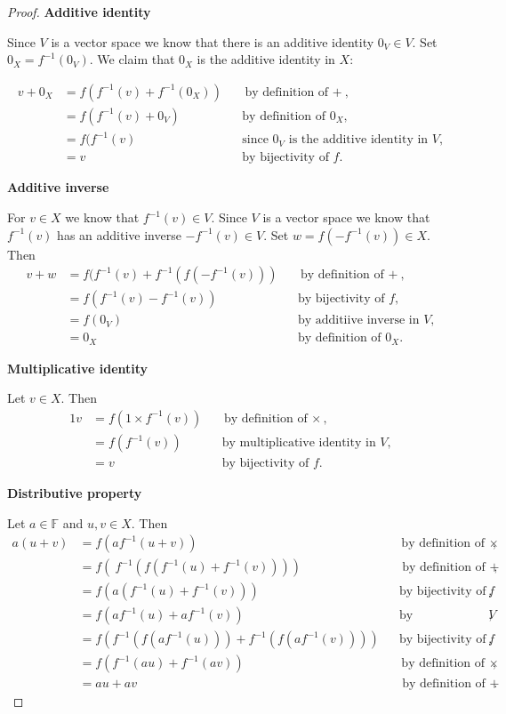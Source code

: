 \documentclass[10pt, a4paper]{article}
\newcommand{\defn}[1]{\textbf{\textsf{#1}}}
\def\F{\mathbb{F}}
\def\f{f}
\def\finv{f^{-1}}
\theoremstyle{break}
\begin{document}
\begin{proof}
\defn{Additive identity}

Since $V$ is a vector space we know that there is an additive identity $0_V \in V$. Set $0_X = \finv(0_V)$. We claim that $0_X$ is the additive identity in $X$:

\begin{align*}
v + 0_X & = \f( \finv(v) + \finv(0_X)) && \text{by definition of $+$}, \\
        & = \f( \finv(v) + 0_V) && \text{by definition of $0_X$}, \\
        & = \f( \finv(v) && \text{since $0_V$ is the additive identity in $V$}, \\
        & = v && \text{by bijectivity of $\f$}.
\end{align*}

\defn{Additive inverse}

For $v \in X$ we know that $\finv(v) \in V$. Since $V$ is a vector space we know that $\finv(v)$ has an additive inverse $-\finv(v) \in V$. Set $w = \f( -\finv(v)) \in X$. Then
\begin{align*}
v + w & = \f( \finv(v) + \finv( \f( -\finv(v))) && \text{by definition of $+$}, \\
      & = \f( \finv(v) - \finv(v)) && \text{by bijectivity of $\f$}, \\
      & = \f(0_V) && \text{by additiive inverse in $V$}, \\
      & = 0_X && \text{by definition of $0_X$}.
\end{align*}

\defn{Multiplicative identity}

Let $v \in X$. Then
\begin{align*}
1 v & = \f(1 \times \finv(v)) && \text{by definition of $\times$}, \\
    & = \f( \finv(v)) && \text{by multiplicative identity in $V$}, \\
    & = v && \text{by bijectivity of $\f$}.
\end{align*}

\defn{Distributive property}

Let $a \in \F$ and $u, v \in X$. Then
\begin{align*}
a(u + v) & = \f(a \finv(u + v)) && \text{by definition of $\times$}, \\
         & = \f(\ \finv( \f( \finv(u) + \finv(v)))) && \text{by definition of $+$}, \\
         & = \f(a (\finv(u) + \finv(v))) && \text{by bijectivity of $\f$}, \\
         & = \f(a \finv(u) + a \finv(v)) && \text{by distributivity in $V$}, \\
         & = \f( \finv( \f( a \finv(u))) + \finv( \f( a \finv(v)))) && \text{by bijectivity of $\f$}, \\
         & = \f( \finv(au) + \finv(av)) && \text{by definition of $\times$}, \\
         & = au + av && \text{by definition of $+$}.
\end{align*}


\end{proof}
\end{document}
